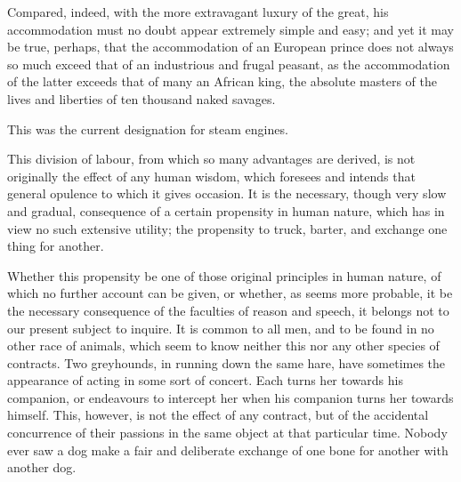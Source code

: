 Compared, indeed, with the more extravagant luxury of the great, his accommodation must no doubt appear extremely simple and easy; and yet it may be true, perhaps, that the accommodation of an European prince does not always so much exceed that of an industrious and frugal peasant, as the accommodation of the latter exceeds that of many an African king, the absolute masters of the lives and liberties of ten thousand naked savages.\par


\begin{readnote}
[1] This was the current designation for steam engines.
\end{readnote}


This division of labour, from which so many advantages are derived, is not originally the effect of any human wisdom, which foresees and intends that general opulence to which it gives occasion. It is the necessary, though very slow and gradual, consequence of a certain propensity in human nature, which has in view no such extensive utility; the propensity to truck, barter, and exchange one thing for another.\par

Whether this propensity be one of those original principles in human nature, of which no further account can be given, or whether, as seems more probable, it be the necessary consequence of the faculties of reason and speech, it belongs not to our present subject to inquire. It is common to all men, and to be found in no other race of animals, which seem to know neither this nor any other species of contracts. Two greyhounds, in running down the same hare, have sometimes the appearance of acting in some sort of concert. Each turns her towards his companion, or endeavours to intercept her when his companion turns her towards himself. This, however, is not the effect of any contract, but of the accidental concurrence of their passions in the same object at that particular time. Nobody ever saw a dog make a fair and deliberate exchange of one bone for another with another dog.\par

